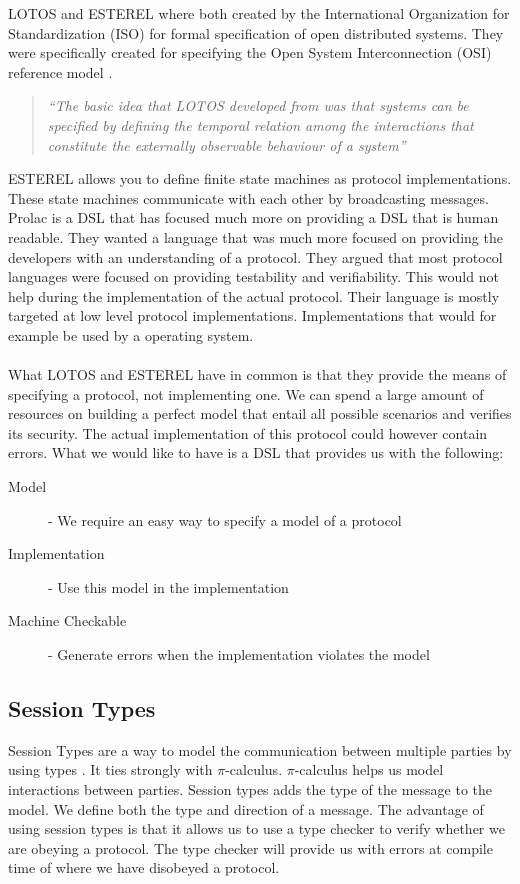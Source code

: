 LOTOS and ESTEREL where both created by the International Organization for Standardization (ISO) for formal specification of open distributed systems. They were specifically created for specifying the Open System Interconnection (OSI) reference model \cite{day1983osi}.
\begin{quote}
	\textit{``The basic idea that LOTOS developed from was that systems can be specified by defining the temporal relation among the interactions that constitute the externally observable behaviour
of a system''}
	\begin{flushright}
		\cite{bolognesi1987introduction}
	\end{flushright}		
\end{quote}
ESTEREL allows you to define finite state machines as protocol implementations. These state machines communicate with each other by broadcasting messages.
\\
Prolac is a DSL that has focused much more on providing a DSL that is human readable. They wanted a language that was much more focused on providing the developers with an understanding of a protocol. They argued that most protocol languages were focused on providing testability and verifiability. This would not help during the implementation of the actual protocol. Their language is mostly targeted at low level protocol implementations. Implementations that would for example be used by a operating system.
\\\\
What LOTOS and ESTEREL have in common is that they provide the means of specifying a protocol, not implementing one. We can spend a large amount of resources on building a perfect model that entail all possible scenarios and verifies its security. The actual implementation of this protocol could however contain errors. What we would like to have is a DSL that provides us with the following:
\begin{description}
  \item[Model] - We require an easy way to specify a model of a protocol
  \item[Implementation] - Use this model in the implementation   
  \item[Machine Checkable] - Generate errors when the implementation violates the model
\end{description}

\subsection{Session Types}
Session Types are a way to model the communication between multiple parties by using types \cite{dardha2012session}. It ties strongly with $\pi$-calculus. $\pi$-calculus helps us model interactions between parties. Session types adds the type of the message to the model. We define both the type and direction of a message. The advantage of using session types is that it allows us to use a type checker to verify whether we are obeying a protocol. The type checker will provide us with errors at compile time of where we have disobeyed a protocol.

